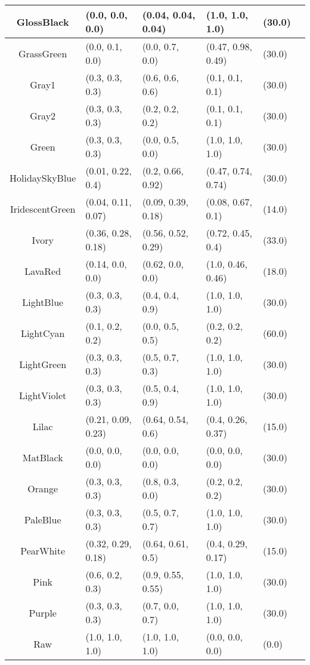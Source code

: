 \begin{table}[H]
\begin{small}
\begin{center}
\begin{tabular}{|c||l|l|l|l|l|}
GlossBlack & (0.0, 0.0, 0.0) & (0.04, 0.04, 0.04) & (1.0, 1.0, 1.0) & (30.0) \\ \hline
GrassGreen & (0.0, 0.1, 0.0) & (0.0, 0.7, 0.0) & (0.47, 0.98, 0.49) & (30.0) \\ \hline
Gray1 & (0.3, 0.3, 0.3) & (0.6, 0.6, 0.6) & (0.1, 0.1, 0.1) & (30.0) \\ \hline
Gray2 & (0.3, 0.3, 0.3) & (0.2, 0.2, 0.2) & (0.1, 0.1, 0.1) & (30.0) \\ \hline
Green & (0.3, 0.3, 0.3) & (0.0, 0.5, 0.0) & (1.0, 1.0, 1.0) & (30.0) \\ \hline
HolidaySkyBlue & (0.01, 0.22, 0.4) & (0.2, 0.66, 0.92) & (0.47, 0.74, 0.74) & (30.0) \\ \hline
IridescentGreen & (0.04, 0.11, 0.07) & (0.09, 0.39, 0.18) & (0.08, 0.67, 0.1) & (14.0) \\ \hline
Ivory & (0.36, 0.28, 0.18) & (0.56, 0.52, 0.29) & (0.72, 0.45, 0.4) & (33.0) \\ \hline
LavaRed & (0.14, 0.0, 0.0) & (0.62, 0.0, 0.0) & (1.0, 0.46, 0.46) & (18.0) \\ \hline
LightBlue & (0.3, 0.3, 0.3) & (0.4, 0.4, 0.9) & (1.0, 1.0, 1.0) & (30.0) \\ \hline
LightCyan & (0.1, 0.2, 0.2) & (0.0, 0.5, 0.5) & (0.2, 0.2, 0.2) & (60.0) \\ \hline
LightGreen & (0.3, 0.3, 0.3) & (0.5, 0.7, 0.3) & (1.0, 1.0, 1.0) & (30.0) \\ \hline
LightViolet & (0.3, 0.3, 0.3) & (0.5, 0.4, 0.9) & (1.0, 1.0, 1.0) & (30.0) \\ \hline
Lilac & (0.21, 0.09, 0.23) & (0.64, 0.54, 0.6) & (0.4, 0.26, 0.37) & (15.0) \\ \hline
MatBlack & (0.0, 0.0, 0.0) & (0.0, 0.0, 0.0) & (0.0, 0.0, 0.0) & (30.0) \\ \hline
Orange & (0.3, 0.3, 0.3) & (0.8, 0.3, 0.0) & (0.2, 0.2, 0.2) & (30.0) \\ \hline
PaleBlue & (0.3, 0.3, 0.3) & (0.5, 0.7, 0.7) & (1.0, 1.0, 1.0) & (30.0) \\ \hline
PearWhite & (0.32, 0.29, 0.18) & (0.64, 0.61, 0.5) & (0.4, 0.29, 0.17) & (15.0) \\ \hline
Pink & (0.6, 0.2, 0.3) & (0.9, 0.55, 0.55) & (1.0, 1.0, 1.0) & (30.0) \\ \hline
Purple & (0.3, 0.3, 0.3) & (0.7, 0.0, 0.7) & (1.0, 1.0, 1.0) & (30.0) \\ \hline
Raw & (1.0, 1.0, 1.0) & (1.0, 1.0, 1.0) & (0.0, 0.0, 0.0) & (0.0) \\ \hline

\end{tabular}
\end{center}
\end{small}
\end{table}

